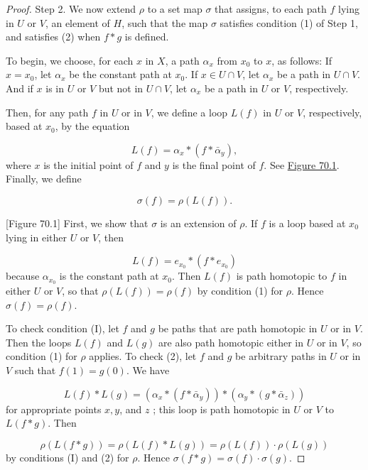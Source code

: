 \begin{proof}
Step 2. We now extend \(\rho\) to a set map \(\sigma\) that assigns, to each path \(f\) lying in \(U\) or \(V\), an element of \(H\), such that the map \(\sigma\) satisfies condition (1) of Step 1, and satisfies (2) when \(f * g\) is defined.

To begin, we choose, for each \(x\) in \(X\), a path \({\alpha }_{x}\) from \(x_{0}\) to \(x\), as follows: If \(x = x_{0}\), let \({\alpha }_{x}\) be the constant path at \(x_{0}\). If \(x \in U \cap V\), let \({\alpha }_{x}\) be a path in \(U \cap V\). And if \(x\) is in \(U\) or \(V\) but not in \(U \cap V\), let \({\alpha }_{x}\) be a path in \(U\) or \(V\), respectively.

Then, for any path \(f\) in \(U\) or in \(V\), we define a loop \(L( f)\) in \(U\) or \(V\), respectively, based at \(x_{0}\), by the equation

\[
L( f) = {\alpha }_{x} * ( {f * \bar{\alpha }_{y}}),
\]
where \(x\) is the initial point of \(f\) and \(y\) is the final point of \(f\). See \hyperref[fig:70.1]{Figure 70.1}. Finally, we define

\[
\sigma ( f) = \rho ( {L( f) }).
\]

[Figure 70.1]
First, we show that \(\sigma\) is an extension of \(\rho\). If \(f\) is a loop based at \(x_{0}\) lying in either \(U\) or \(V\), then

\[
L( f) = e_{x_{0}} * ( {f * e_{x_{0}}})
\]
because \({\alpha }_{x_{0}}\) is the constant path at \(x_{0}\). Then \(L( f)\) is path homotopic to \(f\) in either \(U\) or \(V\), so that \(\rho ( {L( f) }) = \rho ( f)\) by condition (1) for \(\rho\). Hence \(\sigma ( f) = \rho ( f)\).

To check condition (I), let \(f\) and \(g\) be paths that are path homotopic in \(U\) or in \(V\). Then the loops \(L( f)\) and \(L( g)\) are also path homotopic either in \(U\) or in \(V\), so condition (1) for \(\rho\) applies. To check (2), let \(f\) and \(g\) be arbitrary paths in \(U\) or in \(V\) such that \(f(1) = g( 0)\). We have

\[
L( f) * L( g) = ( {{\alpha }_{x} * ( {f * \bar{\alpha }_{y}}) }) * ( {{\alpha }_{y} * ( {g * \bar{\alpha }_{z}}) })
\]
for appropriate points \(x,y\), and \(z\) ; this loop is path homotopic in \(U\) or \(V\) to \(L( {f * g})\). Then

\[
\rho ( {L( {f * g}) }) = \rho ( {L( f) * L( g) }) = \rho ( {L( f) }) \cdot \rho ( {L( g) })
\]
by conditions (I) and (2) for \(\rho\). Hence \(\sigma ( {f * g}) = \sigma ( f) \cdot \sigma ( g)\).


\end{proof}

